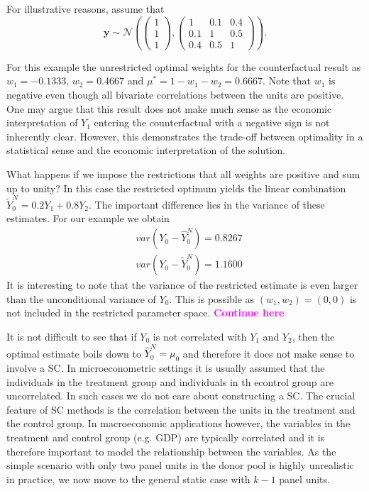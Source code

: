 For illustrative reasons, assume that 
\[
\boldsymbol{y} \sim \mathcal{N}\left( 
\begin{pmatrix} 1\\ 1\\ 1 \end{pmatrix}, 
\begin{pmatrix} 1 &0.1 &0.4\\0.1 &1 &0.5\\0.4 &0.5 &1 \end{pmatrix}\right). 
\] 

For this example the unrestricted optimal weights for the counterfactual result as $w_1 = -0.1333$, $w_2 = 0.4667$ and $\mu^* = 1- w_1 - w_2 = 0.6667$. Note that $w_1$ is negative even though all bivariate correlations between the units are positive. One may argue that this result does not make much sense as the economic interpretation of $Y_1$ entering the counterfactual with a negative sign is not inherently clear. However, this demonstrates the trade-off between optimality in a statistical sense and the economic interpretation of the solution.  

What happens if we impose the restrictions that all weights are positive and sum up to unity? In this case the restricted optimum yields the linear combination $\widetilde{Y}^{N}_{0} = 0.2 Y_1 + 0.8 Y_2$. The important difference lies in the variance of these estimates. For our example we obtain
\begin{equation*}
	\begin{split}
		& var(Y_0 - \widehat{Y}^{N}_{0}) = 0.8267 \\
		& var(Y_0 - \widetilde{Y}^{N}_{0}) = 1.1600	
	\end{split}
\end{equation*}
It is interesting to note that the variance of the restricted estimate is even larger than the unconditional variance of $Y_0$. This is possible as $(w_1, w_2) = (0,0)$ is not included in the restricted parameter space. 
\textcolor{magenta}{\textbf{Continue here}}


It is not difficult to see that if $Y_0$ is not correlated with $Y_1$ and $Y_2$, then the optimal estimate boils down to $\widehat{Y}^{N}_{0} = \mu_0$ and therefore it does not make sense to involve a \ac{SC}. In microeconometric settings it is usually assumed that the individuals in the treatment group and individuals in th econtrol group are uncorrelated. In such cases we do not care about constructing a \ac{SC}. The crucial feature of \ac{SC} methods is the correlation between the units in the treatment and the control group. In macroeconomic applications however, the variables in the treatment and control group (e.g. \ac{GDP}) are typically correlated and it is therefore important to model the relationship between the variables. As the simple scenario with only two panel units in the donor pool is highly unrealistic in practice, we now move to the general static case with $k-1$ panel units.
